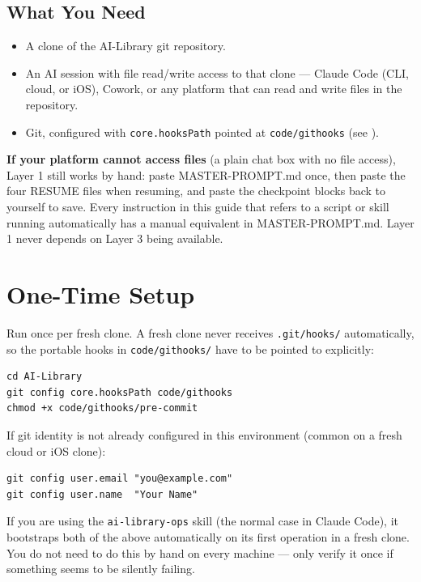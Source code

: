 \documentclass[12pt,letterpaper]{article}
\begin{document}
\subsection{What You Need}

\begin{itemize}
\item A clone of the AI-Library git repository.
\item An AI session with file read/write access to that clone --- Claude
      Code (CLI, cloud, or iOS), Cowork, or any platform that can read and
      write files in the repository.
\item Git, configured with \texttt{core.hooksPath} pointed at
      \texttt{code/githooks} (see ).
\end{itemize}

\begin{mdframed}[style=notebox]
\textbf{If your platform cannot access files} (a plain chat box with no
file access), Layer 1 still works by hand: paste MASTER-PROMPT.md once,
then paste the four RESUME files when resuming, and paste the checkpoint
blocks back to yourself to save. Every instruction in this guide that
refers to a script or skill running automatically has a manual equivalent
in MASTER-PROMPT.md. Layer 1 never depends on Layer 3 being available.
\end{mdframed}

\section{One-Time Setup}
\label{sec:hooks}

Run once per fresh clone. A fresh clone never receives \texttt{.git/hooks/}
automatically, so the portable hooks in \texttt{code/githooks/} have to be
pointed to explicitly:

\begin{lstlisting}
cd AI-Library
git config core.hooksPath code/githooks
chmod +x code/githooks/pre-commit
\end{lstlisting}

If git identity is not already configured in this environment (common on
a fresh cloud or iOS clone):

\begin{lstlisting}
git config user.email "you@example.com"
git config user.name  "Your Name"
\end{lstlisting}

If you are using the \texttt{ai-library-ops} skill (the normal case in
Claude Code), it bootstraps both of the above automatically on its first
operation in a fresh clone. You do not need to do this by hand on every
machine --- only verify it once if something seems to be silently failing.
\end{document}
